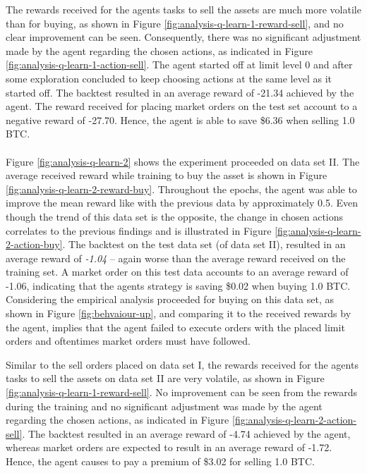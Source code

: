The rewards received for the agents tasks to sell the assets are much more volatile than for buying, as shown in Figure \ref{fig:analysis-q-learn-1-reward-sell}, and no clear improvement can be seen.
Consequently, there was no significant adjustment made by the agent regarding the chosen actions, as indicated in Figure \ref{fig:analysis-q-learn-1-action-sell}.
The agent started off at limit level 0 and after some exploration concluded to keep choosing actions at the same level as it started off.
The backtest resulted in an average reward of -21.34 achieved by the agent.
The reward received for placing market orders on the test set account to a negative reward of -27.70.
Hence, the agent is able to save \$6.36 when selling 1.0 BTC.
\\
\\
Figure \ref{fig:analysis-q-learn-2} shows the experiment proceeded on data set II.
The average received reward while training to buy the asset is shown in Figure \ref{fig:analysis-q-learn-2-reward-buy}.
Throughout the epochs, the agent was able to improve the mean reward like with the previous data by approximately 0.5.
Even though the trend of this data set is the opposite, the change in chosen actions correlates to the previous findings and is illustrated in Figure \ref{fig:analysis-q-learn-2-action-buy}.
The backtest on the test data set (of data set II), resulted in an average reward of \textit{-1.04} -- again worse than the average reward received on the training set.
A market order on this test data accounts to an average reward of -1.06, indicating that the agents strategy is saving \$0.02 when buying 1.0 BTC.
Considering the empirical analysis proceeded for buying on this data set, as shown in Figure \ref{fig:behvaiour-up}, and comparing it to the received rewards by the agent, implies that the agent failed to execute orders with the placed limit orders and oftentimes market orders must have followed.

Similar to the sell orders placed on data set I, the rewards received for the agents tasks to sell the assets on data set II are very volatile, as shown in Figure \ref{fig:analysis-q-learn-1-reward-sell}.
No improvement can be seen from the rewards during the training and no significant adjustment was made by the agent regarding the chosen actions, as indicated in Figure \ref{fig:analysis-q-learn-2-action-sell}.
The backtest resulted in an average reward of -4.74 achieved by the agent, whereas market orders are expected to result in an average reward of -1.72.
Hence, the agent causes to pay a premium of \$3.02 for selling 1.0 BTC.

